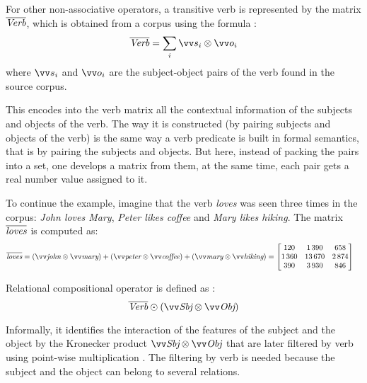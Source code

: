For other non-associative operators, a transitive verb is represented by the matrix $\overline{\text{\it Verb}}$, which is obtained from a corpus using the formula \cite{Grefenstette:2011:ESC:2145432.2145580}:
$$
\overline{\text{\it Verb}} = \sum_i\ov{s_i} \otimes \ov{o_i}
$$
where $\ov{s_i}$ and $\ov{o_i}$ are the subject-object pairs of the verb found in the source corpus.

This encodes into the verb matrix all the contextual information of the subjects and objects of the verb. The way it is constructed (by pairing subjects and objects of the verb) is the same way a verb predicate is built in formal semantics, that is by pairing the subjects and objects. But here, instead of packing the pairs into a set, one develops a matrix from them, at the same time, each pair gets a real number value assigned to it.

To continue the example, imagine that the verb \textit{loves} was seen three times in the corpus: \textit{John loves Mary}, \textit{Peter likes coffee} and \textit{Mary likes hiking}. The matrix $\overline{\text{\it loves}}$ is computed as:
\begin{align*}
  \overline{\text{\it loves}} &= (\ov{\text{\it john}} \otimes \ov{\text{\it mary}}) + %
                                 (\ov{\text{\it peter}} \otimes \ov{\text{\it coffee}}) + %
                                 (\ov{\text{\it mary}} \otimes \ov{\text{\it hiking}}) = %
                                \begin{bmatrix}
                                     120 &  1\,390 &    658 \\
                                  1\,360 & 13\,670 & 2\,874 \\
                                     390 &  3\,930 &    846
                                \end{bmatrix}
\end{align*}

Relational compositional operator is defined as \cite{Grefenstette:2011:ESC:2145432.2145580}:
\begin{equation*}
  \overline{\text{\it Verb}} \odot (\ov{\text{\it Sbj}} \otimes \ov{\text{\it Obj}})
\end{equation*}

Informally, it identifies the interaction of the features of the subject and the object by the Kronecker product $\ov{\text{\it Sbj}} \otimes \ov{\text{\it Obj}}$ that are later filtered by verb using point-wise multiplication \cite{Grefenstette:2011:ESC:2145432.2145580}. The filtering by verb is needed because the subject and the object can belong to several relations.

